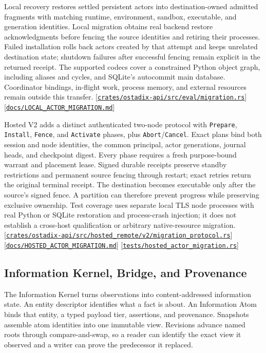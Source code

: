 \documentclass[11pt,oneside]{article}
\newcommand{\src}[1]{\textcolor{OSlate}{\scriptsize[\href{https://github.com/lostadi/OSTADIX/blob/c0b02c326b2329a95ba52447c7180bc93957cd57/#1}{\nolinkurl{#1}}]}\allowbreak}
\begin{document}
Local recovery restores settled persistent actors into destination-owned
admitted fragments with matching runtime, environment, sandbox, executable,
and generation identities. Local migration obtains real backend restore
acknowledgments before fencing the source identities and retiring their
processes. Failed installation rolls back actors created by that attempt and
keeps unrelated destination state; shutdown failures after successful fencing
remain explicit in the returned receipt. The supported codecs cover a
constrained Python object graph, including aliases and cycles, and SQLite's
autocommit main database. Coordinator bindings, in-flight work, process memory,
and external resources remain outside this transfer.
\src{crates/ostadix-api/src/eval/migration.rs}
\src{docs/LOCAL_ACTOR_MIGRATION.md}

Hosted V2 adds a distinct authenticated two-node protocol with
\texttt{Prepare}, \texttt{Install}, \texttt{Fence}, and \texttt{Activate}
phases, plus \texttt{Abort}/\texttt{Cancel}. Exact plans bind both session and
node identities, the common principal, actor generations, journal heads, and
checkpoint digest. Every phase requires a fresh purpose-bound warrant and
placement lease. Signed durable receipts preserve standby restrictions and
permanent source fencing through restart; exact retries return the original
terminal receipt. The destination becomes executable only after the source's
signed fence. A partition can therefore prevent progress while preserving
exclusive ownership. Test coverage uses separate local TLS node processes
with real Python or SQLite restoration and process-crash injection; it does
not establish a cross-host qualification or arbitrary native-resource migration.
\src{crates/ostadix-api/src/hosted_remote/v2/migration_protocol.rs}
\src{docs/HOSTED_ACTOR_MIGRATION.md}
\src{tests/hosted_actor_migration.rs}

\subsection{Information Kernel, Bridge, and Provenance}
\label{sec:information}

The Information Kernel turns observations into content-addressed information
state. An entity descriptor identifies what a fact is about. An Information
Atom binds that entity, a typed payload tier, assertions, and provenance.
Snapshots assemble atom identities into one immutable view. Revisions advance
named roots through compare-and-swap, so a reader can identify the exact view
it observed and a writer can prove the predecessor it replaced.
\end{document}
